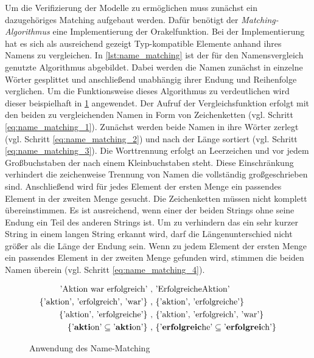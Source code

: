 Um die Verifizierung der Modelle zu ermöglichen muss zunächst ein dazugehöriges Matching aufgebaut werden.
Dafür benötigt der \emph{Matching-Algorithmus} eine Implementierung der Orakelfunktion.
Bei der Implementierung hat es sich als ausreichend gezeigt Typ-kompatible Elemente anhand ihres Namens zu vergleichen.
In \cref{lst:name_matching} ist der für den Namensvergleich genutzte Algorithmus abgebildet.
Dabei werden die Namen zunächst in einzelne Wörter gesplittet und anschließend unabhängig ihrer Endung und Reihenfolge verglichen.
Um die Funktionsweise dieses Algorithmus zu verdeutlichen wird dieser beispielhaft in \cref{eq:name_matching} angewendet.
Der Aufruf der Vergleichsfunktion erfolgt mit den beiden zu vergleichenden Namen in Form von Zeichenketten (vgl. Schritt \ref{eq:name_matching_1}).
Zunächst werden beide Namen in ihre Wörter zerlegt (vgl. Schritt \ref{eq:name_matching_2}) und nach der Länge sortiert (vgl. Schritt \ref{eq:name_matching_3}).
Die Worttrennung erfolgt an Leerzeichen und vor jedem Großbuchstaben der nach einem Kleinbuchstaben steht.
Diese Einschränkung verhindert die zeichenweise Trennung von Namen die vollständig großgeschrieben sind.
Anschließend wird für jedes Element der ersten Menge ein passendes Element in der zweiten Menge gesucht.
Die Zeichenketten müssen nicht komplett übereinstimmen.
Es ist ausreichend, wenn einer der beiden Strings ohne seine Endung ein Teil des anderen Strings ist.
Um zu verhindern das ein sehr kurzer String in einem langen String erkannt wird, darf die Längenunterschied nicht größer als die Länge der Endung sein.
Wenn zu jedem Element der ersten Menge ein passendes Element in der zweiten Menge gefunden wird, stimmen die beiden Namen überein (vgl. Schritt \ref{eq:name_matching_4}).

\begin{figure}
    \centering
    \begin{align}
        \text{'Aktion war erfolgreich'}\ ,&\ \text{'ErfolgreicheAktion'} \label{eq:name_matching_1}\\
        \text{\{'aktion', 'erfolgreich', 'war'\}}\ ,&\ \text{\{'aktion', 'erfolgreiche'\}} \label{eq:name_matching_2}\\
        \text{\{'aktion', 'erfolgreiche'\}}\ ,&\ \text{\{'aktion', 'erfolgreich', 'war'\}} \label{eq:name_matching_3}\\
        \text{\{'\textbf{akti}on'} \subseteq \text{'\textbf{akti}on'\}}\ ,&\ \text{\{'\textbf{erfolgreic}he'} \subseteq \text{'\textbf{erfolgrei}ch'\}} \label{eq:name_matching_4}
    \end{align}
    \caption{Anwendung des Name-Matching}
    \label{eq:name_matching}
\end{figure}

